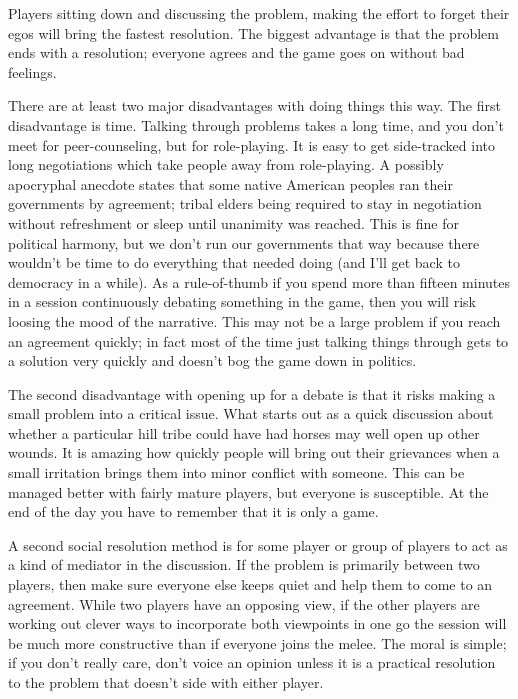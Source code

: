 \documentclass[twoside]{book}
\begin{document}
Players sitting down and discussing the problem, making the effort to
forget their egos will bring the fastest resolution. The biggest
advantage is that the problem ends with a resolution; everyone agrees
and the game goes on without bad feelings.

There are at least two major disadvantages with doing things this
way. The first disadvantage is time. Talking through problems takes a
long time, and you don't meet for peer-counseling, but for
role-playing. It is easy to get side-tracked into long negotiations
which take people away from role-playing. A possibly apocryphal
anecdote states that some native American peoples ran their
governments by agreement; tribal elders being required to stay in
negotiation without refreshment or sleep until unanimity was
reached. This is fine for political harmony, but we don't run our
governments that way because there wouldn't be time to do everything
that needed doing (and I'll get back to democracy in a while). As a
rule-of-thumb if you spend more than fifteen minutes in a session
continuously debating something in the game, then you will risk
loosing the mood of the narrative. This may not be a large problem if
you reach an agreement quickly; in fact most of the time just talking
things through gets to a solution very quickly and doesn't bog the
game down in politics.

The second disadvantage with opening up for a debate is that it risks
making a small problem into a critical issue. What starts out as a
quick discussion about whether a particular hill tribe could have had
horses may well open up other wounds. It is amazing how quickly people
will bring out their grievances when a small irritation brings them
into minor conflict with someone. This can be managed better with
fairly mature players, but everyone is susceptible. At the end of the
day you have to remember that it is only a game.

A second social resolution method is for some player or group of
players to act as a kind of mediator in the discussion. If the problem
is primarily between two players, then make sure everyone else keeps
quiet and help them to come to an agreement. While two players have an
opposing view, if the other players are working out clever ways to
incorporate both viewpoints in one go the session will be much more
constructive than if everyone joins the melee. The moral is simple; if
you don't really care, don't voice an opinion unless it is a practical
resolution to the problem that doesn't side with either player.
\end{document}
